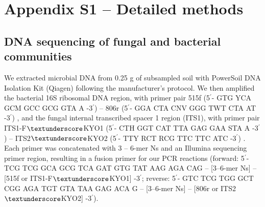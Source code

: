 \section{Appendix S1 -- Detailed methods}
\subsection{DNA sequencing of fungal and bacterial communities}
We extracted microbial DNA from 0.25 g of subsampled soil with PowerSoil DNA Isolation Kit (Qiagen) following the manufacturer's protocol. We then amplified the bacterial 16S ribosomal DNA region, with primer pair 515f (5$^\prime$- GTG YCA GCM GCC GCG GTA A -3$^\prime$) -- 806r (5$^\prime$- GGA CTA CNV GGG TWT CTA AT -3$^\prime$) \citep{Caporaso2012}, and the fungal internal transcribed spacer 1 region (ITS1), with primer pair ITS1-F$\textunderscore$KYO1 (5$^\prime$- CTH GGT CAT TTA GAG GAA STA A -3$^\prime$) -- ITS2$\textunderscore$KYO2 (5$^\prime$- TTY RCT RCG TTC TTC ATC -3$^\prime$) \citep{Toju2012}. Each primer was concatenated with 3 -- 6-mer Ns \citep{Lundberg2013} and an Illumina sequencing primer region, resulting in a fusion primer for our PCR reactions (forward: 5$^\prime$- TCG TCG GCA GCG TCA GAT GTG TAT AAG AGA CAG -- [3--6-mer Ns] -- [515f or ITS1-F$\textunderscore$KYO1] -3$^\prime$; reverse: 5$^\prime$- GTC TCG TGG GCT CGG AGA TGT GTA TAA GAG ACA G -- [3--6-mer Ns] -- [806r or ITS2$\textunderscore$KYO2] -3$^\prime$). 
\par


